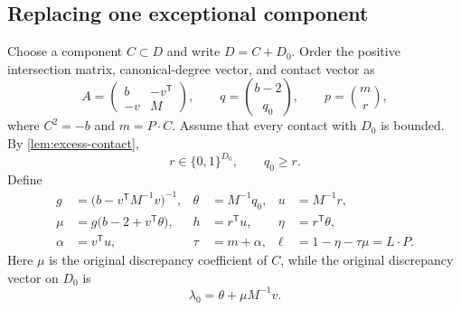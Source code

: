 \documentclass[11pt,reqno]{amsart}
\theoremstyle{definition}
\theoremstyle{remark}
\numberwithin{equation}{section}
\begin{document}
\subsection{Replacing one exceptional component}

Choose a component $C\subset D$ and write $D=C+D_0$.  Order the positive intersection matrix, canonical-degree vector, and contact vector as
\begin{equation}\label{eq:replacement-block-data}
  A=
  \begin{pmatrix}
    b&-v^{\mathsf T}\\
    -v&M
  \end{pmatrix},
  \qquad
  q=\binom{b-2}{q_0},
  \qquad
  p=\binom{m}{r},
\end{equation}
where $C^2=-b$ and $m=P\cdot C$.  Assume that every contact with $D_0$ is bounded.  By \cref{lem:excess-contact},
\begin{equation}\label{eq:replacement-simple-complement}
  r\in\{0,1\}^{D_0},
  \qquad q_0\ge r.
\end{equation}
Define
\begin{align}
  g&=\bigl(b-v^{\mathsf T}M^{-1}v\bigr)^{-1},
  &\theta&=M^{-1}q_0,
  &u&=M^{-1}r,\label{eq:replacement-scalars-1}\\
  \mu&=g\bigl(b-2+v^{\mathsf T}\theta\bigr),
  &h&=r^{\mathsf T}u,
  &\eta&=r^{\mathsf T}\theta,\label{eq:replacement-scalars-2}\\
  \alpha&=v^{\mathsf T}u,
  &\tau&=m+\alpha,
  &\ell&=1-\eta-\tau\mu=L\cdot P.\label{eq:replacement-scalars-3}
\end{align}
Here $\mu$ is the original discrepancy coefficient of $C$, while the original discrepancy vector on $D_0$ is
\begin{equation}\label{eq:old-restricted-discrepancy}
  \lambda_0=\theta+\mu M^{-1}v.
\end{equation}
\end{document}
